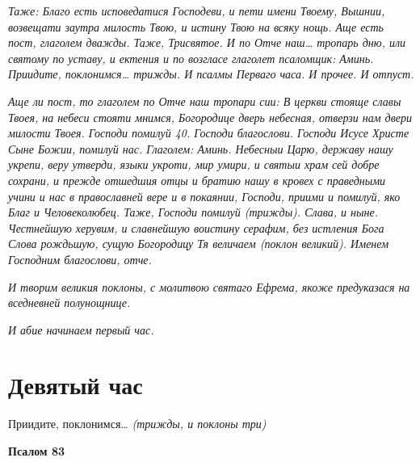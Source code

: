  \itshape Таже:\normalfont{} Благо есть исповедатися Господеви, и пети имени Твоему,
Вышнии, возвещати заутра милость Твою, и истину Твою на всяку нощь.
\itshape Аще есть пост, глаголем дважды. Таже,\normalfont{} \itshape Трисвятое\normalfont{}. \itshape И по\normalfont{} Отче наш… \itshape тропарь
дню, или святому по уставу, и ектения и по возгласе глаголет псаломщик:\normalfont{}
Аминь. Приидите, поклонимся… \itshape трижды. И псалмы Перваго часа. И прочее.
И отпуст.\normalfont{}


 \itshape Аще ли пост, то глаголем по Отче наш тропари сии:\normalfont{} В церкви стояще
славы Твоея, на небеси стояти мнимся, Богородице дверь небесная, отверзи
нам двери милости Твоея. Господи помилуй \itshape 40\normalfont{}. Господи благослови. Господи
Исусе Христе Сыне Божии, помилуй нас. \itshape Глаголем:\normalfont{} Аминь. Небесныи Царю,
державу нашу укрепи, веру утверди, языки укроти, мир умири, и
святыи храм сей добре сохрани, и прежде отшедшия отцы и братию
нашу в кровех с праведными учини и нас в православней вере и в
покаянии, Господи, приими и помилуй, яко Благ и Человеколюбец. \itshape Таже\normalfont{},
Господи помилуй \itshape (трижды)\normalfont{}. \itshape Слава, и ныне\normalfont{}. Честнейшую херувим, и
славнейшую воистину серафим, без истления Бога Слова рождьшую, сущую
Богородицу Тя величаем \itshape (поклон великий)\normalfont{}. Именем Господним благослови,
отче.


 \itshape И творим великия поклоны, с молитвою святаго Ефрема, якоже
предуказася на вседневней полунощнице.\normalfont{}


 \itshape И абие начинаем первый час.\normalfont{}


\section{Девятый час}



Приидите, поклонимся… \itshape (трижды, и поклоны три)\normalfont{}






 

\bfseries Псалом 83\normalfont{}


